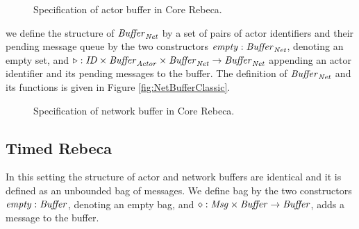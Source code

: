 \begin{figure}[h]
	\centering
	
	\caption{Specification of actor buffer in Core Rebeca.}
	\label{fig:ActBufferClassic}
\end{figure}

we define the structure of $\mathit{Buffer}_{\it Net}$ by a set of pairs of actor identifiers and their pending message queue by the two constructors $\mathit{empty}: \mathit{Buffer}_{\it Net}$, denoting an empty set, and $\triangleright: \mathit{ID} \times \mathit{Buffer}_{\it Actor} \times \mathit{Buffer}_{\it Net} \rightarrow \mathit{Buffer}_{\it Net}$ appending an actor identifier and its pending messages to the buffer. The definition of $\mathit{Buffer}_{\it Net}$ and its functions is given in Figure \ref{fig:NetBufferClassic}.


\begin{figure}[h]
	\centering
	
	\caption{Specification of network buffer in Core Rebeca.}
	\label{fig:netBufferClassic}
\end{figure}


\subsection{Timed Rebeca}
In this setting the structure of actor and network buffers are identical and it is defined as an unbounded bag of messages. We define bag by the two constructors $\mathit{empty}: \mathit{Buffer}$, denoting an empty bag, and $\diamond: \mathit{Msg} \times \mathit{Buffer}\rightarrow \mathit{Buffer}$, adds a message to the buffer. 

